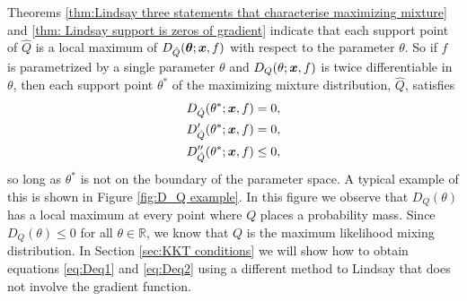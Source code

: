 	Theorems \ref{thm:Lindsay three statements that characterise maximizing mixture} and \ref{thm: Lindsay support is zeros of gradient} indicate that each support point of $\hat{Q}$ is a local maximum of $D_{\hat{Q}}({\bm{{\theta}}}; {\bm{{x}}}, f)$ with respect to the parameter $\theta$. So if $f$ is parametrized by a single parameter $\theta$ and $D_Q(\theta;{\bm{{x}}},f)$ is twice differentiable in $\theta$, then each support point $\theta^*$ of the maximizing mixture distribution, $\hat{Q}$, satisfies
	\begin{align}
		D_{\hat{Q}}(\theta^*;{\bm{{x}}}, f) &= 0, 
		\label{eq:Deq1}\\
		D'_{\hat{Q}}(\theta^*;{\bm{{x}}}, f) &= 0, 
		\label{eq:Deq2}\\
		D''_{\hat{Q}}(\theta^*;{\bm{{x}}}, f) &\leq 0,
		\label{eq:Deq3}
	\end{align}
	so long as $\theta^*$ is not on the boundary of the parameter space. A typical example of this is shown in Figure \ref{fig:D_Q example}. In this figure we observe that $D_Q(\theta)$ has a local maximum at every point where $Q$ places a probability mass. Since $D_Q(\theta) \leq 0$ for all $\theta \in \mathbb{R}$, we know that $Q$ is the maximum likelihood mixing distribution. In Section \ref{sec:KKT conditions} we will show how to obtain equations \eqref{eq:Deq1} and \eqref{eq:Deq2} using a different method to Lindsay that does not involve the gradient function.


